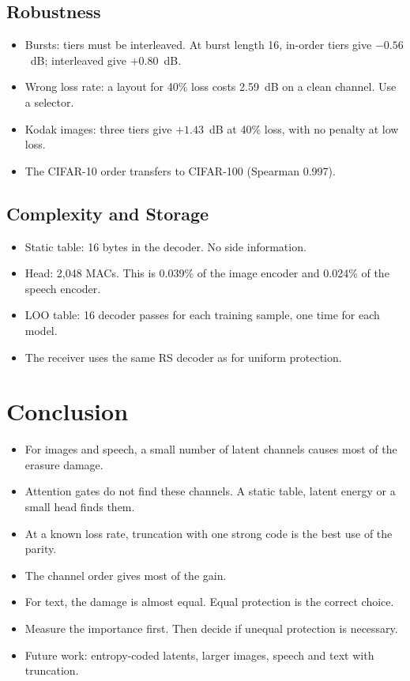 \documentclass[journal]{IEEEtran}
\begin{document}
\subsection{Robustness}
\begin{itemize}
\item Bursts: tiers must be interleaved. At burst length 16, in-order tiers give $-0.56$~dB; interleaved give $+0.80$~dB.
\item Wrong loss rate: a layout for 40\% loss costs 2.59~dB on a clean channel. Use a selector.
\item Kodak images: three tiers give $+1.43$~dB at 40\% loss, with no penalty at low loss.
\item The CIFAR-10 order transfers to CIFAR-100 (Spearman 0.997).
\end{itemize}

\subsection{Complexity and Storage}
\begin{itemize}
\item Static table: 16 bytes in the decoder. No side information.
\item Head: 2,048 MACs. This is 0.039\% of the image encoder and 0.024\% of the speech encoder.
\item LOO table: 16 decoder passes for each training sample, one time for each model.
\item The receiver uses the same RS decoder as for uniform protection.
\end{itemize}

\section{Conclusion}\label{sec:conclusion}
\begin{itemize}
\item For images and speech, a small number of latent channels causes most of the erasure damage.
\item Attention gates do not find these channels. A static table, latent energy or a small head finds them.
\item At a known loss rate, truncation with one strong code is the best use of the parity.
\item The channel order gives most of the gain.
\item For text, the damage is almost equal. Equal protection is the correct choice.
\item Measure the importance first. Then decide if unequal protection is necessary.
\item Future work: entropy-coded latents, larger images, speech and text with truncation.
\end{itemize}



\end{document}
